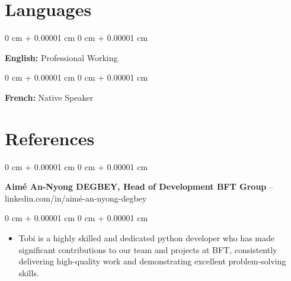 \documentclass[10pt, letterpaper]{article}
\newenvironment{highlights}{
    \begin{itemize}[
        topsep=0.10 cm,
        parsep=0.10 cm,
        partopsep=0pt,
        itemsep=0pt,
        leftmargin=0 cm + 10pt
    ]
}{
    \end{itemize}
} %
\newenvironment{onecolentry}{
    \begin{adjustwidth}{
        0 cm + 0.00001 cm
    }{
        0 cm + 0.00001 cm
    }
}{
    \end{adjustwidth}
} %
\begin{document}
    
    \section{Languages}



        
        \begin{onecolentry}
            \textbf{English:} Professional Working
        \end{onecolentry}

        \vspace{0.2 cm}

        \begin{onecolentry}
            \textbf{French:} Native Speaker
        \end{onecolentry}


    
    \section{References}



        
        \begin{onecolentry}
            \textbf{Aimé An-Nyong DEGBEY, Head of Development BFT Group} -- linkedin.com/in/aimé-an-nyong-degbey\end{onecolentry}

        \vspace{0.10 cm}
        \begin{onecolentry}
            \begin{highlights}
                \item Tobi is a highly skilled and dedicated python developer who has made significant contributions to our team and projects at BFT, consistently delivering high-quality work and demonstrating excellent problem-solving skills.
            \end{highlights}
        \end{onecolentry}



    
\end{document}
